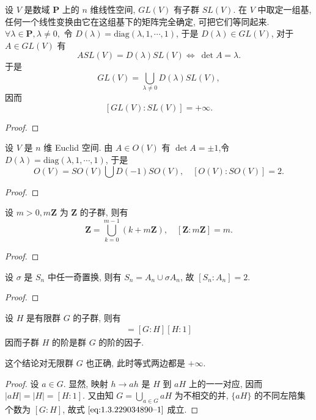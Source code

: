 \documentclass[../../main.tex]{subfiles}
\begin{document}
\begin{example}
设 \( V \) 是数域 \( \mathbf{P} \) 上的 \( n \) 维线性空间, \( GL(V) \) 有子群 \( SL(V) \). 在 \( V \) 中取定一组基, 任何一个线性变换由它在这组基下的矩阵完全确定, 可把它们等同起来.\( \forall \lambda \in \mathbf{P}, \lambda \neq 0, \) 令 \( D(\lambda) = \text{diag}(\lambda, 1, \cdots, 1) \), 于是 \( D(\lambda) \in GL(V) \), 对于 \( A \in GL(V) \) 有
\[
A SL(V) = D(\lambda) SL(V)\iff \ \det A = \lambda.
\]
于是
\[
GL(V) = \bigcup_{\lambda \neq 0} D(\lambda) SL(V),
\]
因而
\[
[GL(V): SL(V)] = +\infty.
\]
\end{example}
\begin{proof}

\end{proof}

\begin{example}
设 \( V \) 是 \( n \) 维 Euclid 空间. 由 \( A \in O(V) \) 有 \( \det A = \pm 1 \),令 \( D(\lambda) = \text{diag}(\lambda, 1, \cdots, 1) \),  于是
\[
O(V) = SO(V) \bigcup D(-1) SO(V),
\quad
[O(V): SO(V)] = 2.
\]
\end{example}
\begin{proof}

\end{proof}

\begin{example}
设 \( m > 0, m\mathbf{Z} \) 为 \( \mathbf{Z} \) 的子群, 则有
\[
\mathbf{Z} = \bigcup_{k=0}^{m-1} (k + m\mathbf{Z}), \quad [\mathbf{Z}: m\mathbf{Z}] = m.
\]
\end{example}
\begin{proof}

\end{proof}

\begin{example}
设 \( \sigma \) 是 \( S_n \) 中任一奇置换, 则有 \( S_n = A_n \cup \sigma A_n \), 故 \( [S_n: A_n] = 2 \).
\end{example}
\begin{proof}

\end{proof}

\begin{theorem}[Lagrange定理]\label{theorem:抽象代数-Lagrange定理-定理 1.3.3}
设 \( H \) 是有限群 \( G \) 的子群, 则有
\begin{align}
[G:1] = [G:H][H:1] \label{eq:1.3.229034890--1}
\end{align}
因而子群 \( H \) 的阶是群 \( G \) 的阶的因子.
\end{theorem}
\begin{remark}
这个结论对无限群 \( G \) 也正确, 此时等式两边都是 \( +\infty \).
\end{remark}
\begin{proof}
设 \( a \in G \). 显然, 映射 \( h \to ah \) 是 \( H \) 到 \( aH \) 上的一一对应, 因而 \( |aH| = |H| = [H:1] \). 又由知 \( G = \bigcup\limits_{a \in G} aH \) 为不相交的并, \( \{aH\} \) 的不同左陪集个数为 \( [G:H] \), 故式 \(\eqref{eq:1.3.229034890--1}\) 成立.
\end{proof}
\end{document}
